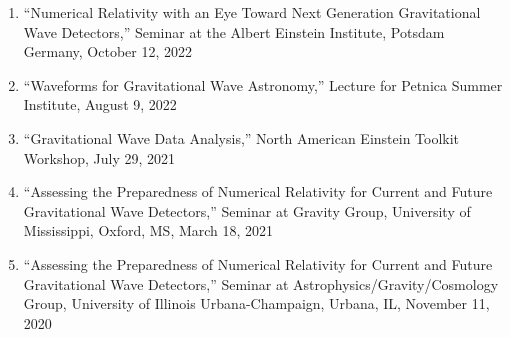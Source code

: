 \documentclass[11pt]{article}
\begin{document}
\begin{flushleft}
\begin{enumerate}
  \item ``Numerical Relativity with an Eye Toward Next Generation Gravitational Wave Detectors,'' Seminar at the Albert Einstein Institute, Potsdam Germany, October 12, 2022 
  \item ``Waveforms for Gravitational Wave Astronomy,'' Lecture for Petnica Summer Institute, August 9, 2022
  \item ``Gravitational Wave Data Analysis,'' North American Einstein Toolkit Workshop, July 29, 2021
  \item ``Assessing the Preparedness of Numerical Relativity for Current and Future Gravitational Wave Detectors,'' Seminar at Gravity Group, University of Mississippi, Oxford, MS, March 18, 2021
  \item ``Assessing the Preparedness of Numerical Relativity for Current and Future Gravitational Wave Detectors,'' Seminar at Astrophysics/Gravity/Cosmology Group, University of Illinois Urbana-Champaign, Urbana, IL, November 11, 2020
  \end{enumerate}

\vspace{8px}


\end{flushleft}
\end{document}
